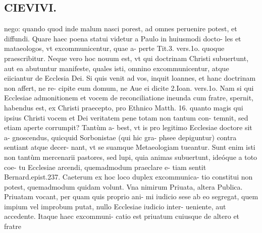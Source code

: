 \documentclass{article}
\begin{document}
\begin{pages}
\section*{CIEVIVI. }
\marginpar{[ p.431 ]}\pstart nego: quando quod inde malum nasci porest, ad omnes peruenire potest, et diffundi. Quare haec poena statui videtur a Paulo in huiusmodi docto- les et mataeologos, vt excommunicentur, quae a- perte Tit.3. vers.1o. quoque praescribitur.  \pend\pstart Neque vero hoc nouum est, vt qui doctrinam Christi subuertunt, aut ea abutuntur manifeste, quales isti, omnino excommunicentur, atque eiiciantur de Ecclesia Dei. Si quis venit ad vos, inquit loannes, et hanc doctrinam non affert, ne re- cipite eum domum, ne Aue ei dicite 2.Ioan. vers.1o. Nam si qui Ecclesiae admonitionem et vocem de reconciliatione ineunda cum fratre, spernit, habendus est, ex Christi praecepto, pro Ethnico Matth. 16. quanto magis qui ipsius Christi vocem et Dei veritatem pene totam non tantum con- temnit, sed etiam aperte corrumpit? Tantùm a- best, vt is pro legitimo Ecclesiae doctore sit a- gnoscendus, quicquid Sorbonistae (qui hic gra- phsee depiguntur) contra sentiant atque decer- nant, vt se suamque Metaeologiam tueantur. Sunt enim isti non tantùm mercenarii pastores, sed lupi, quia animas subuertunt, ideóque a toto coe- tu Ecclesiae arcendi, quemadmodum praeclare e- tiam sentit Bernard.epist.237.  \pend\pstart Caeterum ex hoc loco duplex excommunica- tio constitui non potest, quemadmodum quidam volunt. Vna nimirum Priuata, altera Publica.  \pend\pstart Priuatam vocant, per quam quis proprio ani- mi iudicio sese ab eo segregat, quem impium vel improbum putat, nullo Ecclesiae iudicio inter- ueniente, aut accedente. Itaque haec excommuni- catio est priuatum cuiusque de altero et fratre  \pend

\end{pages}
\end{document}
